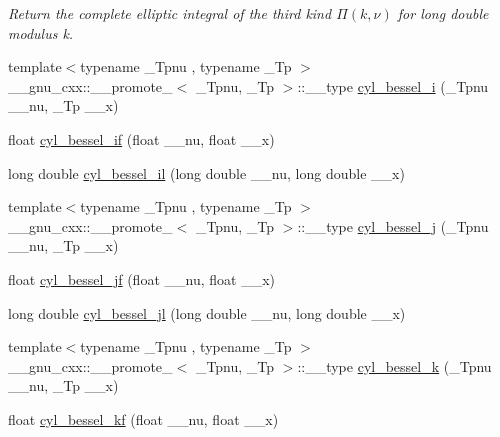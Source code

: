 \begin{DoxyCompactItemize}
\begin{DoxyCompactList}\small\item\em Return the complete elliptic integral of the third kind $ \Pi(k,\nu) $ for {\ttfamily long double} modulus {\ttfamily k}. \end{DoxyCompactList}\item 
{\footnotesize template$<$typename \+\_\+\+Tpnu , typename \+\_\+\+Tp $>$ }\\\+\_\+\+\_\+gnu\+\_\+cxx\+::\+\_\+\+\_\+promote\+\_$<$ \+\_\+\+Tpnu, \+\_\+\+Tp $>$\+::\+\_\+\+\_\+type \hyperlink{group__tr29124__math__spec__func_ga1c9b5a5c36f000a4f0a55f7fcc486cb0}{cyl\+\_\+bessel\+\_\+i} (\+\_\+\+Tpnu \+\_\+\+\_\+nu, \+\_\+\+Tp \+\_\+\+\_\+x)
\item 
float \hyperlink{group__tr29124__math__spec__func_gaaf738427d4da0bda66bc2274dfb853a7}{cyl\+\_\+bessel\+\_\+if} (float \+\_\+\+\_\+nu, float \+\_\+\+\_\+x)
\item 
long double \hyperlink{group__tr29124__math__spec__func_gab7962629216d03efb8ecaa3f70c6878f}{cyl\+\_\+bessel\+\_\+il} (long double \+\_\+\+\_\+nu, long double \+\_\+\+\_\+x)
\item 
{\footnotesize template$<$typename \+\_\+\+Tpnu , typename \+\_\+\+Tp $>$ }\\\+\_\+\+\_\+gnu\+\_\+cxx\+::\+\_\+\+\_\+promote\+\_$<$ \+\_\+\+Tpnu, \+\_\+\+Tp $>$\+::\+\_\+\+\_\+type \hyperlink{group__tr29124__math__spec__func_ga47e21a13b6d68d0d7f057699bd3b3ce0}{cyl\+\_\+bessel\+\_\+j} (\+\_\+\+Tpnu \+\_\+\+\_\+nu, \+\_\+\+Tp \+\_\+\+\_\+x)
\item 
float \hyperlink{group__tr29124__math__spec__func_ga15731a7bccd6351d28353e3c4c2a2d23}{cyl\+\_\+bessel\+\_\+jf} (float \+\_\+\+\_\+nu, float \+\_\+\+\_\+x)
\item 
long double \hyperlink{group__tr29124__math__spec__func_gade8e94a80520a8b628b2d658755b25c0}{cyl\+\_\+bessel\+\_\+jl} (long double \+\_\+\+\_\+nu, long double \+\_\+\+\_\+x)
\item 
{\footnotesize template$<$typename \+\_\+\+Tpnu , typename \+\_\+\+Tp $>$ }\\\+\_\+\+\_\+gnu\+\_\+cxx\+::\+\_\+\+\_\+promote\+\_$<$ \+\_\+\+Tpnu, \+\_\+\+Tp $>$\+::\+\_\+\+\_\+type \hyperlink{group__tr29124__math__spec__func_ga76dcd3884620955680112aca0d327ada}{cyl\+\_\+bessel\+\_\+k} (\+\_\+\+Tpnu \+\_\+\+\_\+nu, \+\_\+\+Tp \+\_\+\+\_\+x)
\item 
float \hyperlink{group__tr29124__math__spec__func_ga1f50047f9aab0ec8b1a1615fe9fbe32f}{cyl\+\_\+bessel\+\_\+kf} (float \+\_\+\+\_\+nu, float \+\_\+\+\_\+x)

\end{DoxyCompactItemize}
